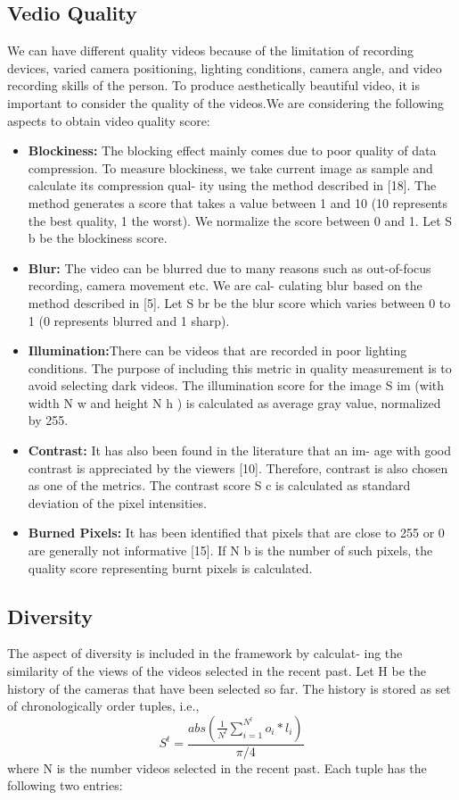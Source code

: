 \documentclass{sig-alternate}
\begin{document}
\subsection{Vedio Quality}
We can have different quality videos because of the limitation of
recording devices, varied camera positioning, lighting conditions,
camera angle, and video recording skills of the person. To produce
aesthetically beautiful video, it is important to consider the quality
of the videos.We are considering the following aspects to obtain
video quality score:

\begin{itemize}
  \item \textbf{Blockiness:} The blocking effect mainly comes due to poor
quality of data compression. To measure blockiness, we take
current image as sample and calculate its compression qual-
ity using the method described in [18]. The method generates
a score that takes a value between 1 and 10 (10 represents the
best quality, 1 the worst). We normalize the score between 0
and 1. Let S b be the blockiness score.
  \item \textbf{Blur:} The video can be blurred due to many reasons such as
out-of-focus recording, camera movement etc. We are cal-
culating blur based on the method described in [5]. Let S br
be the blur score which varies between 0 to 1 (0 represents
blurred and 1 sharp).
  \item \textbf{Illumination:}There can be videos that are recorded in poor
lighting conditions. The purpose of including this metric in
quality measurement is to avoid selecting dark videos. The
illumination score for the image S im (with width N w and
height N h ) is calculated as average gray value, normalized
by 255.
  \item \textbf{Contrast:} It has also been found in the literature that an im-
age with good contrast is appreciated by the viewers [10].
Therefore, contrast is also chosen as one of the metrics. The
contrast score S c is calculated as standard deviation of the
pixel intensities.
  \item \textbf{Burned Pixels: }It has been identified that pixels that are
close to 255 or 0 are generally not informative [15]. If N b
is the number of such pixels, the quality score representing
burnt pixels is calculated.
\end{itemize}

\subsection{Diversity}
The aspect of diversity is included in the framework by calculat-
ing the similarity of the views of the videos selected in the recent
past. Let H be the history of the cameras that have been selected
so far. The history is stored as set of chronologically order tuples,
i.e.,
    \begin{equation}
              S^t = \frac{abs(\frac{1}{N^l}\sum_{i=1}^{N^l}o_{i}*l_{i})}{\pi/4}
       \end{equation}
where N is the number videos selected in the recent past. Each
tuple has the following two entries:
\end{document}
